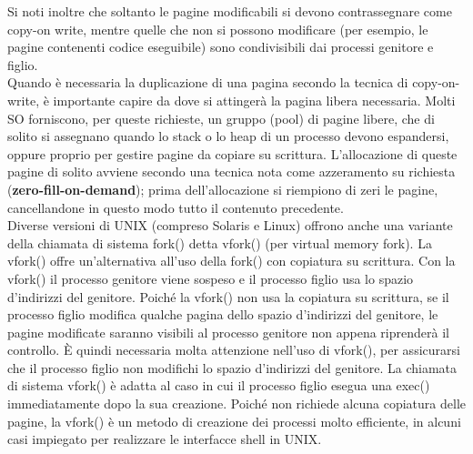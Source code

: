 \documentclass{article}
\begin{document}
				Si noti inoltre che soltanto le pagine modificabili si devono contrassegnare come copy-on write, mentre
				quelle che non si possono modificare (per esempio, le pagine contenenti codice eseguibile) sono condivisibili dai processi genitore e figlio.
				\\Quando è necessaria la duplicazione di una pagina secondo la tecnica di copy-on-write, è importante capire da dove si attingerà la pagina libera necessaria. Molti SO forniscono, per queste richieste, un gruppo (pool) di pagine libere, che di solito si assegnano quando lo stack o lo heap di un processo devono espandersi, oppure proprio per gestire pagine da copiare su scrittura. L’allocazione di queste pagine di solito avviene secondo una tecnica nota come azzeramento su richiesta (\textbf{zero-fill-on-demand}); prima dell’allocazione si riempiono di zeri le pagine, cancellandone in questo modo tutto il contenuto precedente.
				\\Diverse versioni di UNIX (compreso Solaris e Linux) offrono anche una variante della chiamata di sistema fork() detta vfork() (per virtual memory fork). La vfork() offre un’alternativa all’uso della fork() con copiatura su scrittura. Con la vfork() il processo genitore viene sospeso e il processo figlio usa lo spazio d’indirizzi del genitore. Poiché la vfork() non usa la copiatura su scrittura, se il processo
				figlio modifica qualche pagina dello spazio d’indirizzi del genitore, le pagine modificate saranno visibili al processo genitore non appena riprenderà il controllo. È quindi necessaria molta attenzione nell’uso di vfork(), per assicurarsi che il processo figlio non modifichi lo spazio d’indirizzi del genitore. La chiamata di sistema vfork() è adatta al caso in cui il processo figlio esegua una exec() immediatamente dopo la sua creazione. Poiché non richiede alcuna copiatura delle pagine, la vfork() è un metodo di creazione dei processi molto efficiente, in alcuni casi impiegato per realizzare le interfacce shell in UNIX.
\end{document}
